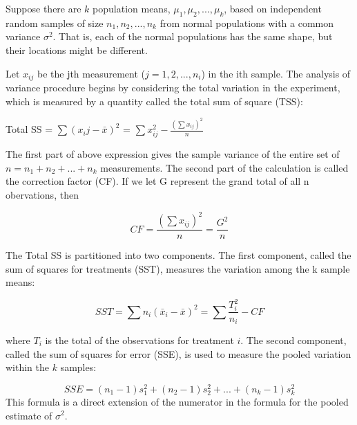 \documentclass[
  ignorenonframetext,
  aspectratio=169]{beamer}
\begin{document}
\begin{frame}{}
\protect\hypertarget{section}{}
\small

Suppose there are \(k\) population means, \(\mu_1, \mu_2, ..., \mu_k\),
based on independent random samples of size \(n_1, n_2, ..., n_k\) from
normal populations with a common variance \(\sigma^2\). That is, each of
the normal populations has the same shape, but their locations might be
different.

Let \(x_{ij}\) be the jth measurement (\(j = 1, 2, ..., n_i\)) in the
ith sample. The analysis of variance procedure begins by considering the
total variation in the experiment, which is measured by a quantity
called the total sum of square (TSS):

Total SS = \(\sum (x_ij - \bar{x})^2\) =
\(\sum x^2_{ij} - \frac{(\sum x_{ij})^2}{n}\)

The first part of above expression gives the sample variance of the
entire set of \(n = n_1 + n_2 + ... + n_k\) measurements. The second
part of the calculation is called the correction factor (CF). If we let
G represent the grand total of all n obervations, then

\[
CF = \frac{(\sum x_{ij})^2}{n} = \frac{G^2}{n}
\]
\end{frame}

\begin{frame}{}
\protect\hypertarget{section-1}{}
\small

The Total SS is partitioned into two components. The first component,
called the sum of squares for treatments (SST), measures the variation
among the k sample means:

\[
SST = \sum n_i (\bar{x}_i - \bar{x})^2 = \sum \frac{T^2_i}{n_i} - CF
\]

where \(T_i\) is the total of the observations for treatment \(i\). The
second component, called the sum of squares for error (SSE), is used to
measure the pooled variation within the \(k\) samples:

\[
SSE = (n_1 - 1)s_1^2 + (n_2 - 1)s_2^2 + ... + (n_k - 1)s_k^2
\] This formula is a direct extension of the numerator in the formula
for the pooled estimate of \(\sigma^2\).
\end{frame}
\end{document}
